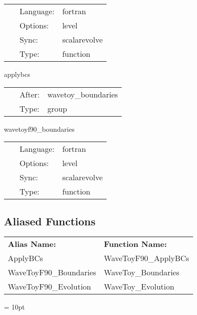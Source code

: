 \hspace{5mm}{\it boundaries of 3d wave equation } 


\hspace{5mm}

 \begin{tabular*}{160mm}{cll} 
~ & Language:  & fortran \\ 
~ & Options:  & level \\ 
~ & Sync:  & scalarevolve \\ 
~ & Type:  & function \\ 
\end{tabular*} 


\vspace{5mm}


\hspace{5mm} applybcs 

\hspace{5mm}{\it apply boundary conditions } 


\hspace{5mm}

 \begin{tabular*}{160mm}{cll} 
~ & After:  & wavetoy\_boundaries \\ 
~ & Type:  & group \\ 
\end{tabular*} 


\vspace{5mm}


\hspace{5mm} wavetoyf90\_boundaries 

\hspace{5mm}{\it boundaries of 3d wave equation } 


\hspace{5mm}

 \begin{tabular*}{160mm}{cll} 
~ & Language:  & fortran \\ 
~ & Options:  & level \\ 
~ & Sync:  & scalarevolve \\ 
~ & Type:  & function \\ 
\end{tabular*} 


\subsection*{Aliased Functions}

\hspace{5mm}

 \begin{tabular*}{160mm}{ll} 

{\bf Alias Name:} ~~~~~~~ & {\bf Function Name:} \\ 
ApplyBCs & WaveToyF90\_ApplyBCs \\ 
WaveToyF90\_Boundaries & WaveToy\_Boundaries \\ 
WaveToyF90\_Evolution & WaveToy\_Evolution \\ 
\end{tabular*} 



\vspace{5mm}\parskip = 10pt 

